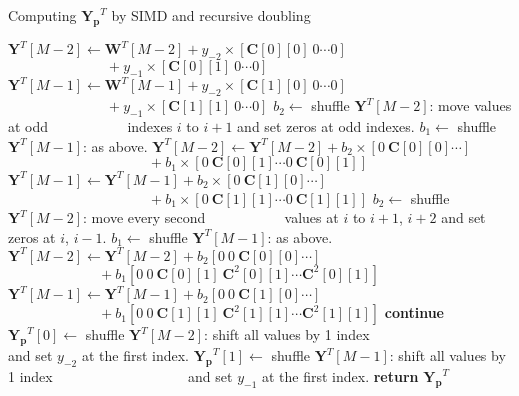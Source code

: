 \begin{algorithm}
    \caption{Computing $\bm{Y_p}^T$ by SIMD and recursive doubling}\label{recursive_doubling}
    \begin{algorithmic}[1]
            \State $\bm{Y}^T[M{-}2] \gets \bm{W}^T[M{-}2] + y_{-2}\times \left[\bm{C}[0][0] ~ 0 \cdots 0\right]$ 
            \Statex $ \quad\quad\quad\quad\quad\quad\quad + y_{-1}\times \left[\bm{C}[0][1] ~ 0 \cdots 0\right]$ 
            \State $\bm{Y}^T[M{-}1] \gets \bm{W}^T[M{-}1] + y_{-2}\times \left[\bm{C}[1][0] ~ 0 \cdots 0\right]$ 
            \Statex $ \quad\quad\quad\quad\quad\quad\quad + y_{-1}\times \left[\bm{C}[1][1] ~ 0 \cdots 0\right]$ 
                    \State $b_2 \gets $ shuffle $\bm{Y}^T[M{-}2]$: move values at odd 
                    \Statex $\quad\quad\quad\quad\quad$ indexes $i$ to $i+1$ and set zeros at odd indexes. 
                    \State $b_1 \gets $ shuffle $\bm{Y}^T[M{-}1]$: as above.
                    \State $\bm{Y}^T[M{-}2] \gets \bm{Y}^T[M{-}2] + b_{2}\times \left[0 ~ \bm{C}[0][0]\cdots \right]$ 
                    \Statex $ \quad\quad\quad\quad\quad\quad\quad\quad\quad\quad + b_{1}\times \left[0 ~ \bm{C}[0][1] \cdots 0 ~ \bm{C}[0][1]\right]$ 
                    \State $\bm{Y}^T[M{-}1] \gets \bm{Y}^T[M{-}1] + b_{2}\times \left[0 ~ \bm{C}[1][0]\cdots \right]$ 
                    \Statex $ \quad\quad\quad\quad\quad\quad\quad\quad\quad\quad + b_{1}\times \left[0 ~ \bm{C}[1][1]\cdots 0 ~ \bm{C}[1][1]\right]$ 
                    \State $b_2 \gets $ shuffle $\bm{Y}^T[M{-}2]$: move every second
                    \Statex $\quad\quad\quad\quad\quad$ values at $i$ to $i{+}1$, $i{+}2$ and set zeros at $i$, $i{-}1$.
                    \State $b_1 \gets $ shuffle $\bm{Y}^T[M{-}1]$: as above.
                    \State $\bm{Y}^T[M{-}2] \gets \bm{Y}^T[M{-}2] + b_{2} \left[0 ~ 0 ~ \bm{C}[0][0]\cdots \right]$ 
                    \Statex $ \quad\quad\quad\quad\quad\quad~~ + b_{1}  \left[0 ~ 0 ~ \bm{C}[0][1] ~ \bm{C}^2[0][1] \cdots \bm{C}^2[0][1]\right]$ 
                    \State $\bm{Y}^T[M{-}1] \gets \bm{Y}^T[M{-}1] + b_{2} \left[0 ~ 0 ~ \bm{C}[1][0]\cdots \right]$ 
                    \Statex $ \quad\quad\quad\quad\quad\quad~~ + b_{1}  \left[0 ~ 0 ~ \bm{C}[1][1] ~ \bm{C}^2[1][1] \cdots \bm{C}^2[1][1]\right]$ 
                    \State \textbf{continue} 
                \EndIf
            \EndFor
            \State $\bm{Y_p}^T[0] \gets $ shuffle $\bm{Y}^T[M{-}2]$: shift all values by 1 index
            \Statex $\quad\quad\quad\quad\quad\quad\quad\quad\quad$ and set $y_{-2}$ at the first index.
            \State $\bm{Y_p}^T[1] \gets $ shuffle $\bm{Y}^T[M{-}1]$: shift all values by 1 index
            \Statex $\quad\quad\quad\quad\quad\quad\quad\quad\quad$ and set $y_{-1}$ at the first index.            
            \State \textbf{return} $\bm{Y_p}^T$ 
        \EndProcedure
    \end{algorithmic}
\end{algorithm}


